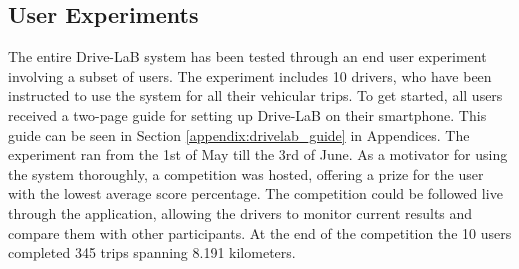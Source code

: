 \subsection{User Experiments}\label{subsec:userexp}

The entire Drive-LaB system has been tested through an end user experiment involving a subset of users. The experiment includes 10 drivers, who have been instructed to use the system for all their vehicular trips. To get started, all users received a two-page guide for setting up Drive-LaB on their smartphone. This guide can be seen in Section \ref{appendix:drivelab_guide} in Appendices. The experiment ran from the 1st of May till the 3rd of June. As a motivator for using the system thoroughly, a competition was hosted, offering a prize for the user with the lowest average score percentage. The competition could be followed live through the application, allowing the drivers to monitor current results and compare them with other participants. At the end of the competition the 10 users completed 345 trips spanning 8.191 kilometers.

